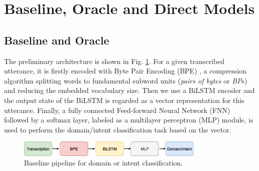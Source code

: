 \section{Baseline, Oracle and Direct Models}
\label{speech:pretrain}

\subsection{Baseline and Oracle}

The preliminary architecture is shown in Fig. \ref{fig:traditional}. For a given transcribed utterance, it is firstly encoded with Byte Pair Encoding (BPE) \citep{sennrich2015neural}, a compression algorithm splitting words to fundamental subword units (\textit{pairs of bytes} or \textit{BP}s) and reducing the embedded vocabulary size. Then we use a BiLSTM \citep{schuster1997bidirectional} encoder and the output state of the BiLSTM is regarded as a vector representation for this utterance. Finally, a fully connected Feed-forward Neural Network (FNN) followed by a softmax layer, labeled as a multilayer perceptron (MLP) module, is used to perform the domain/intent classification task based on the vector.




\begin{figure}[!htp]
	\centering\includegraphics[width=0.8\textwidth]{Graph/speech/Baseline.png}
	\caption{Baseline pipeline for domain or intent classification.}
	\label{fig:traditional}
\end{figure}



